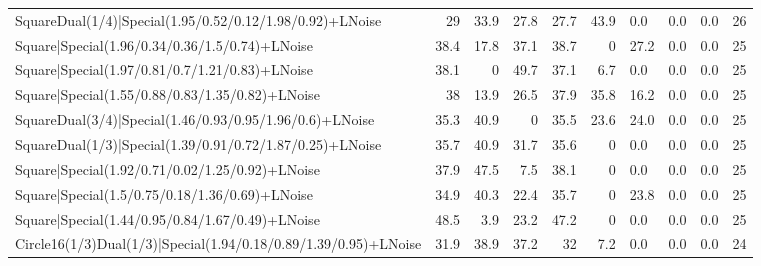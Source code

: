 \begin{tabular}{lrrrrrlllr}
 SquareDual(1/4)|Special(1.95/0.52/0.12/1.98/0.92)+LNoise        &            29   &            33.9 &            27.8 &            27.7 &           43.9 & 0.0             & 0.0            & 0.0            &           26 \\
 Square|Special(1.96/0.34/0.36/1.5/0.74)+LNoise                  &            38.4 &            17.8 &            37.1 &            38.7 &            0   & 27.2            & 0.0            & 0.0            &           25 \\
 Square|Special(1.97/0.81/0.7/1.21/0.83)+LNoise                  &            38.1 &             0   &            49.7 &            37.1 &            6.7 & 0.0             & 0.0            & 0.0            &           25 \\
 Square|Special(1.55/0.88/0.83/1.35/0.82)+LNoise                 &            38   &            13.9 &            26.5 &            37.9 &           35.8 & 16.2            & 0.0            & 0.0            &           25 \\
 SquareDual(3/4)|Special(1.46/0.93/0.95/1.96/0.6)+LNoise         &            35.3 &            40.9 &             0   &            35.5 &           23.6 & 24.0            & 0.0            & 0.0            &           25 \\
 SquareDual(1/3)|Special(1.39/0.91/0.72/1.87/0.25)+LNoise        &            35.7 &            40.9 &            31.7 &            35.6 &            0   & 0.0             & 0.0            & 0.0            &           25 \\
 Square|Special(1.92/0.71/0.02/1.25/0.92)+LNoise                 &            37.9 &            47.5 &             7.5 &            38.1 &            0   & 0.0             & 0.0            & 0.0            &           25 \\
 Square|Special(1.5/0.75/0.18/1.36/0.69)+LNoise                  &            34.9 &            40.3 &            22.4 &            35.7 &            0   & 23.8            & 0.0            & 0.0            &           25 \\
 Square|Special(1.44/0.95/0.84/1.67/0.49)+LNoise                 &            48.5 &             3.9 &            23.2 &            47.2 &            0   & 0.0             & 0.0            & 0.0            &           25 \\
 Circle16(1/3)Dual(1/3)|Special(1.94/0.18/0.89/1.39/0.95)+LNoise &            31.9 &            38.9 &            37.2 &            32   &            7.2 & 0.0             & 0.0            & 0.0            &           24 \\

\end{tabular}
